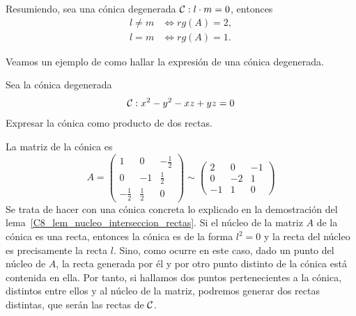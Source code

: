 Resumiendo, sea una cónica degenerada $\mathcal{C}:l\cdot m=0$, entonces
\begin{equation}
\begin{split}
l\not=m &\Leftrightarrow rg(A)=2,\\
l=m&\Leftrightarrow rg(A)=1.
\end{split}
\end{equation}

Veamos un ejemplo de como hallar la expresión de una cónica degenerada.

\begin{exa}
	Sea la cónica degenerada
	\begin{equation}
	\mathcal{C}: x^2-y^2-xz+yz=0
	\end{equation}
	Expresar la cónica como producto de dos rectas.
	
	La matriz de la cónica es
	\begin{equation}
	A=\left( \begin{array}{rrr}
	1&0&-\frac{1}{2}\\
	0&-1&\frac{1}{2}\\
	-\frac{1}{2}&\frac{1}{2}& 0
	\end{array}\right) \sim
	\left( \begin{array}{rrr}
	2&0&-1\\
	0&-2&1\\
	-1&1&0
	\end{array}\right)
	\end{equation}
	Se trata de hacer con una cónica concreta lo explicado en la demostración del lema~\ref{C8_lem_nucleo_interseccion_rectas}. Si el núcleo de la matriz $A$ de la cónica es una recta, entonces la cónica es de la forma $l^2=0$ y la recta del núcleo es precisamente la recta $l$. Sino, como ocurre en este caso, dado un punto del núcleo de $A$, la recta generada por él y por otro punto distinto de la cónica está contenida en ella. Por tanto, si hallamos dos puntos pertenecientes a la cónica, distintos entre ellos y al núcleo de la matriz, podremos generar dos rectas distintas, que serán las rectas de $\mathcal{C}$.
	

\end{exa}
